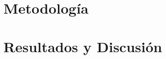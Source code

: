 \documentclass[final,5p,times,twocolumn,authoryear]{elsarticle}
\begin{document}
\section{Metodología}
\label{metodología}


\section{Resultados y Discusión}
\label{resultados}




 







\end{document}
